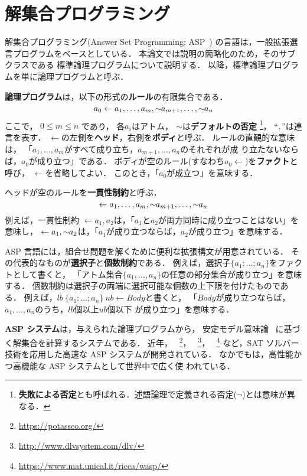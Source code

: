 \section{解集合プログラミング} \label{chap:asp}

解集合プログラミング(Answer Set Programming; ASP~\cite{%
  Baral03:cambridge,%
  Gelfond88:iclp,%
  Inoue08:jssst,%
  Niemela99:amai})
の言語は，一般拡張選言プログラムをベースとしている．
本論文では説明の簡略化のため，そのサブクラスである
標準論理プログラムについて説明する．
以降，標準論理プログラムを単に論理プログラムと呼ぶ．

\textbf{論理プログラム}は，以下の形式の\textbf{ルール}の有限集合である．
\begin{equation}
  \label{eq:rule}
  a_0\leftarrow a_1,\dots,a_m,{\sim\!\!{a_{m+1}}},\dots,{\sim\!\!{a_n}}
\end{equation}
ここで，
$0\leq m\leq n$ であり，
各$a_i$はアトム，
${\sim\!\!{}}$は\textbf{デフォルトの否定}
\footnote{\textbf{失敗による否定}とも呼ばれる．述語論理で定義される否定($\neg$)とは意味が異なる．}，
``$,$''は連言を表す．
$\leftarrow$の左側を\textbf{ヘッド}，右側を\textbf{ボディ}と呼ぶ．
ルールの直観的な意味は，
「$a_1,\ldots,a_m$がすべて成り立ち，$a_{m+1},\ldots,a_n$のそれぞれが成
り立たないならば，$a_0$が成り立つ」である．
ボディが空のルール(すなわち\(a_0\leftarrow\))を\textbf{ファクト}と呼び，
$\leftarrow$を省略してよい．
このとき，「$a_0$が成立つ」を意味する．

ヘッドが空のルールを\textbf{一貫性制約}と呼ぶ．
\begin{equation}
  \label{eq:constr}
  \leftarrow a_1,\dots,a_m,{\sim\!\!{a_{m+1}}},\dots,{\sim\!\!{a_n}}
\end{equation}
例えば，一貫性制約
\(\leftarrow a_1,a_2\)は，「$a_1$と$a_2$が両方同時に成り立つことはない」を意味し，
\(\leftarrow a_1, {\sim\!\!{a_{2}}}\)は，「$a_1$が成り立つならば，$a_2$が成り立つ」を意味する．

ASP 言語には，組合せ問題を解くために便利な拡張構文が用意されている．
その代表的なものが\textbf{選択子}と\textbf{個数制約}である．
例えば，選択子\(\{a_1;\dots;a_n\}\)をファクトとして書くと，
「アトム集合\(\{a_1,\dots,a_n\}\)の任意の部分集合が成り立つ」を意味する．
個数制約は選択子の両端に選択可能な個数の上下限を付けたものである．
例えば，\(lb\ \{a_1;\dots;a_n\}\ ub \leftarrow Body\)と書くと，
「$Body$が成り立つならば，$a_1,\dots,a_n$のうち，$lb$個以上$ub$個以下
が成り立つ」を意味する．

\textbf{ASP システム}は，与えられた論理プログラムから，
安定モデル意味論~\cite{Gelfond88:iclp}
に基づく解集合を計算するシステムである．
近年，
{\clingo}~\footnote{\url{https://potassco.org/}}，
{\dlv}~\footnote{\url{http://www.dlvsystem.com/dlv/}}，
{\wasp}~\footnote{\url{https://www.mat.unical.it/ricca/wasp/}}
など，SAT ソルバー技術を応用した高速な ASP システムが開発されている．
なかでも{\clingo}は，高性能かつ高機能な ASP システムとして世界中で広く使
われている．

